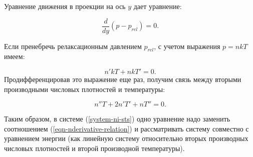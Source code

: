 \documentclass[12pt]{article}
\begin{document}



Уравнение движения в проекции на ось $y$ дает уравнение:

\begin{equation}
  \frac{d}{dy}\left(p-p_{rel} \right)=0.
\end{equation}

Если пренебречь релаксационным давлением $p_{rel}$, с учетом выражения $p=nkT$ имеем:

\begin{equation}
  n'kT + nkT' = 0.
\end{equation}
Продифференцировав это выражение еще раз, получим связь между вторыми производными числовых плотностей и температуры:

\begin{equation}
  n''T + 2n'T' + nT'' = 0.\label{eqn-nderivative-relation}
\end{equation}

Таким образом, в системе (\ref{system-ni-sts}) одно уравнение надо заменить соотношением (\ref{eqn-nderivative-relation}) и рассматривать систему совместно с уравнением энергии (как линейную систему относительно вторых производных числовых плотностей и второй производной температуры).



\end{document}
